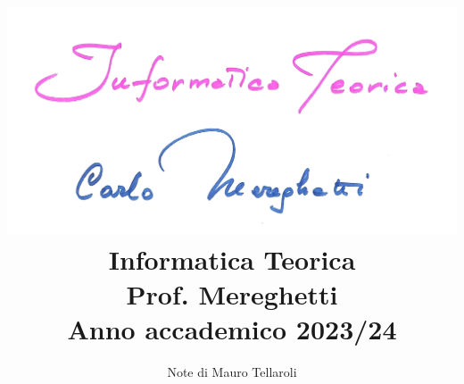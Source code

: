 \documentclass[a4paper]{article}
\begin{document}
\title{
    \includegraphics[width=\textwidth]{Mere.png}\\
    \Huge Informatica Teorica\\[.2em]
    \large Prof. Mereghetti\\[.2em]
    \Large Anno accademico 2023/24
}
\author{
    \large Note di Mauro Tellaroli
}
\date{}

\maketitle

\thispagestyle{empty}

\clearpage

\addtocounter{page}{-1}
\tableofcontents
\clearpage

\setcounter{section}{-1}

\clearpage

\clearpage

\clearpage
\end{document}
